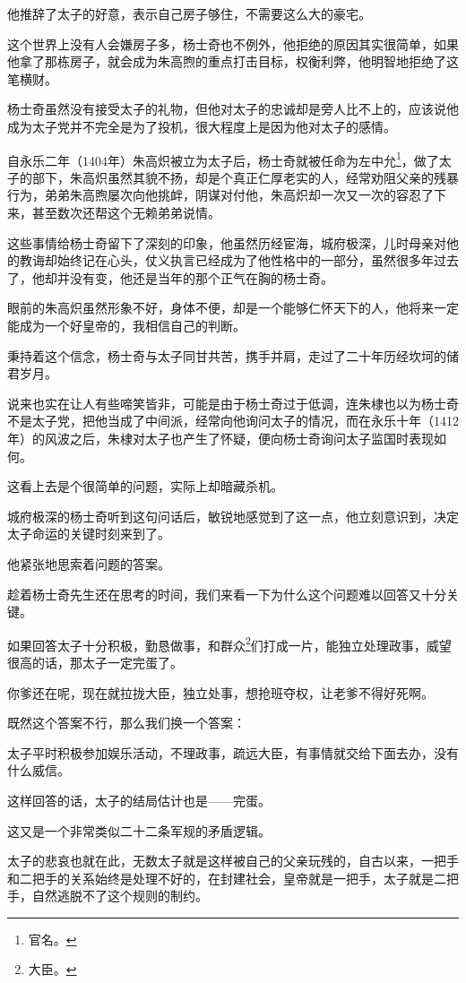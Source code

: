 \begin{multicols}{\theparacolNo}
他推辞了太子的好意，表示自己房子够住，不需要这么大的豪宅。

这个世界上没有人会嫌房子多，杨士奇也不例外，他拒绝的原因其实很简单，如果他拿了那栋房子，就会成为朱高煦的重点打击目标，权衡利弊，他明智地拒绝了这笔横财。

杨士奇虽然没有接受太子的礼物，但他对太子的忠诚却是旁人比不上的，应该说他成为太子党并不完全是为了投机，很大程度上是因为他对太子的感情。

自永乐二年（1404年）朱高炽被立为太子后，杨士奇就被任命为左中允\footnote{官名。}，做了太子的部下，朱高炽虽然其貌不扬，却是个真正仁厚老实的人，经常劝阻父亲的残暴行为，弟弟朱高煦屡次向他挑衅，阴谋对付他，朱高炽却一次又一次的容忍了下来，甚至数次还帮这个无赖弟弟说情。

这些事情给杨士奇留下了深刻的印象，他虽然历经宦海，城府极深，儿时母亲对他的教诲却始终记在心头，仗义执言已经成为了他性格中的一部分，虽然很多年过去了，他却并没有变，他还是当年的那个正气在胸的杨士奇。

眼前的朱高炽虽然形象不好，身体不便，却是一个能够仁怀天下的人，他将来一定能成为一个好皇帝的，我相信自己的判断。

秉持着这个信念，杨士奇与太子同甘共苦，携手并肩，走过了二十年历经坎坷的储君岁月。

说来也实在让人有些啼笑皆非，可能是由于杨士奇过于低调，连朱棣也以为杨士奇不是太子党，把他当成了中间派，经常向他询问太子的情况，而在永乐十年（1412年）的风波之后，朱棣对太子也产生了怀疑，便向杨士奇询问太子监国时表现如何。

这看上去是个很简单的问题，实际上却暗藏杀机。

城府极深的杨士奇听到这句问话后，敏锐地感觉到了这一点，他立刻意识到，决定太子命运的关键时刻来到了。

他紧张地思索着问题的答案。

趁着杨士奇先生还在思考的时间，我们来看一下为什么这个问题难以回答又十分关键。

如果回答太子十分积极，勤恳做事，和群众\footnote{大臣。}们打成一片，能独立处理政事，威望很高的话，那太子一定完蛋了。

你爹还在呢，现在就拉拢大臣，独立处事，想抢班夺权，让老爹不得好死啊。

既然这个答案不行，那么我们换一个答案：

太子平时积极参加娱乐活动，不理政事，疏远大臣，有事情就交给下面去办，没有什么威信。

这样回答的话，太子的结局估计也是——完蛋。

这又是一个非常类似二十二条军规的矛盾逻辑。

太子的悲哀也就在此，无数太子就是这样被自己的父亲玩残的，自古以来，一把手和二把手的关系始终是处理不好的，在封建社会，皇帝就是一把手，太子就是二把手，自然逃脱不了这个规则的制约。


\end{multicols}
